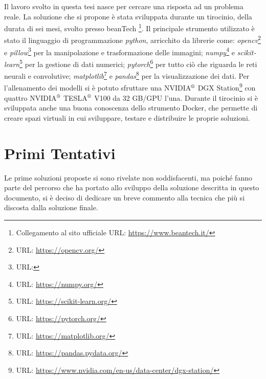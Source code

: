 Il lavoro svolto in questa tesi nasce per cercare una risposta ad un problema reale.
La soluzione che si propone è stata sviluppata durante un tirocinio, della durata di sei mesi, svolto presso beanTech \footnote{Collegamento al sito ufficiale URL: \url{https://www.beantech.it/}}.
Il principale strumento utilizzato è stato il linguaggio di programmazione \textit{python}, arricchito da librerie come:
\textit{opencv}\footnote{URL: \url{https://opencv.org/}} e \textit{pillow}\footnote{URL: } per la manipolazione e trasformazione delle immagini; 
\textit{numpy}\footnote{URL: \url{https://numpy.org/}} e \textit{scikit-learn}\footnote{URL: \url{https://scikit-learn.org/}} per la gestione di dati numerici;
\textit{pytorch}\footnote{URL: \url{https://pytorch.org/}} per tutto ciò che riguarda le reti neurali e convolutive;
\textit{matplotlib}\footnote{URL: \url{https://matplotlib.org/}} e \textit{pandas}\footnote{URL: \url{https://pandas.pydata.org/}} per la visualizzazione dei dati.
Per l'allenamento dei modelli si è potuto sfruttare una NVIDIA$^{\text{\textregistered}}$ DGX Station\footnote{URL: \url{https://www.nvidia.com/en-us/data-center/dgx-station/}} con quattro NVIDIA$^{\text{\textregistered}}$ TESLA$^{\text{\textregistered}}$ V100 da 32 GB/GPU l'una.
Durante il tirocinio si è sviluppata anche una buona conoscenza dello strumento Docker, che permette di creare spazi virtuali in cui sviluppare, testare e distribuire le proprie soluzioni.

\section{Primi Tentativi}
Le prime soluzioni proposte si sono rivelate non soddisfacenti, ma poiché fanno parte del percorso che ha portato allo sviluppo della soluzione descritta in questo documento, si è deciso di dedicare un breve commento alla tecnica che più si discosta dalla soluzione finale.

